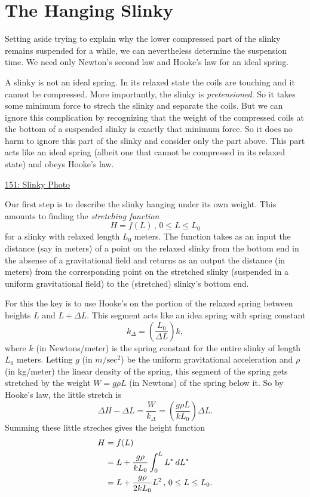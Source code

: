\documentclass{ximera}
\begin{document}
\section{The Hanging Slinky}

Setting aside trying to explain why the lower compressed part of the slinky remains suspended for a while, we can nevertheless determine the suspension time. We need only Newton's second law and Hooke's law for an ideal spring.

A slinky is not an ideal spring. In its relaxed state the coils are touching and it cannot be compressed. More importantly, the slinky is \emph{pretensioned}. So it takes some minimum force to strech the slinky and separate the coils. But we can ignore this complication by recognizing that the weight of the compressed coils at the bottom of a suspended slinky is exactly that minimum force. So it does no harm to ignore this part of the slinky and consider only the part above. This part acts like an ideal spring (albeit one that cannot be compressed in its relaxed state) and obeys Hooke's law.

\begin{onlineOnly}
    \begin{center}
\end{center}
\end{onlineOnly}

\href{https://www.desmos.com/calculator/zqjjgael5j}{151: Slinky Photo}



Our first step is to describe the slinky hanging under its own weight. This amounts to finding the \emph{stretching function}
\[
   H = f(L) \, , \, 0\leq L \leq L_0 
\]
for a slinky with relaxed length $L_0$ meters. The function takes as an input the distance (say in meters) of a point on the relaxed slinky from the bottom end in the absense of a gravitational field and returns as an output the distance (in meters) from the corresponding point on the stretched slinky (suspended in a uniform gravitational field) to the (stretched) slinky's bottom end. 

For this the key is to use Hooke's on the portion of the relaxed spring between heights $L$ and $L+\Delta L$. This segment acts like an idea spring with spring constant
\[
        k_\Delta  =  \left( \frac{L_0}{\Delta L} \right) k,   
\]
where $k$ (in Newtons/meter) is the spring constant for the entire slinky of length $L_0$ meters. Letting $g$ (in $m/\text{sec}^2$) be the uniform gravitational acceleration and $\rho$ (in kg/meter) the linear density of the spring, this segment of the spring gets stretched by the weight $W =g \rho L$ (in Newtons) of the spring below it. So by Hooke's law, the little stretch is
\[
     \Delta H - \Delta L =  \frac{W}{k_\Delta} = \left( \frac{g\rho L}{k L_0} \right) \Delta L .
\]
Summing these little streches gives the height function
\begin{align}
    H &= f(L)   \notag  \\
        &= L +  \frac{g\rho}{k L_0} \int_0^L L^* \, dL^*  \notag \\
         & = L + \frac{g\rho}{2kL_0}L^2 \, , \, 0\leq L \leq L_0 .  \label{Eq:Stretch}
\end{align}
\end{document}
